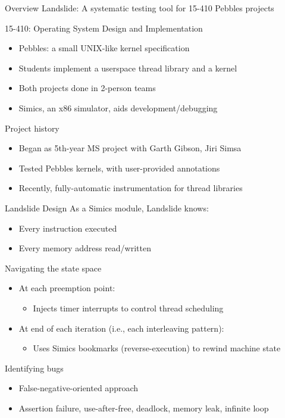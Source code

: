 \documentclass[xcolor=dvipsnames]{beamer}
\begin{document}
\begin{frame}{Overview}
	Landslide: A systematic testing tool for 15-410 Pebbles projects
	\linegap

	15-410: Operating System Design and Implementation
	\begin{itemize}
		\item Pebbles: a small UNIX-like kernel specification
		\item Students implement a userspace thread library and a kernel
		\item Both projects done in 2-person teams
		\item Simics, an x86 simulator, aids development/debugging
	\end{itemize}
	\pause
	\linegap

	Project history
	\begin{itemize}
		\item Began as 5th-year MS project with Garth Gibson, Jiri Simsa
		\item Tested Pebbles kernels, with user-provided annotations
		\item Recently, fully-automatic instrumentation for thread libraries
	\end{itemize}
\end{frame}

\begin{frame}{Landslide Design}
	As a Simics module, Landslide knows:
	\begin{itemize}
		\item Every instruction executed
		\item Every memory address read/written
	\end{itemize}
	\pause
	\linegap

	Navigating the state space
	\begin{itemize}
		\item At each preemption point:
		\begin{itemize}
			\item Injects timer interrupts to control thread scheduling
		\end{itemize}
		\item At end of each iteration (i.e., each interleaving pattern):
		\begin{itemize}
			\item Uses Simics bookmarks (reverse-execution) to rewind machine state
		\end{itemize}
	\end{itemize}
	\pause
	\linegap

	Identifying bugs
	\begin{itemize}
		\item False-negative-oriented approach %
		\item Assertion failure, use-after-free, deadlock, memory leak, infinite loop
	\end{itemize}
\end{frame}
\end{document}

